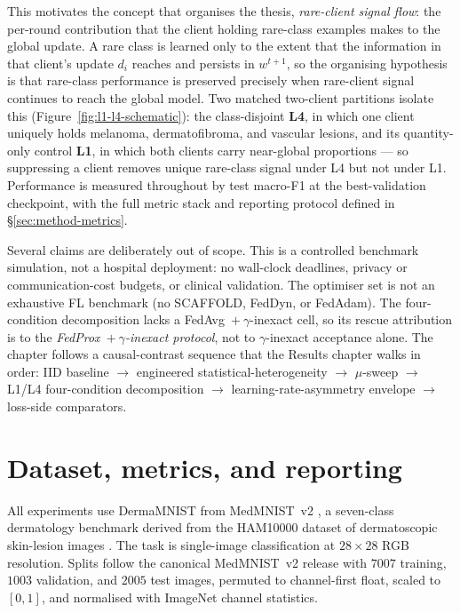 \documentclass[11pt,a4paper]{report}
\begin{document}
This motivates the concept that organises the thesis, \emph{rare-client signal
flow}: the per-round contribution that the client holding rare-class examples
makes to the global update. A rare class is learned only to the extent that the
information in that client's update $d_i$ reaches and persists in $w^{t+1}$, so the
organising hypothesis is that rare-class performance is preserved precisely when
rare-client signal continues to reach the global model. Two matched two-client
partitions isolate this (Figure~\ref{fig:l1-l4-schematic}): the class-disjoint
\textbf{L4}, in which one client uniquely holds melanoma, dermatofibroma, and
vascular lesions, and its quantity-only control \textbf{L1}, in which both clients
carry near-global proportions --- so suppressing a client removes unique
rare-class signal under L4 but not under L1. Performance is measured throughout by
test macro-F1 at the best-validation checkpoint, with the full metric stack and
reporting protocol defined in \S\ref{sec:method-metrics}.

Several claims are deliberately out of scope. This is a controlled benchmark
simulation, not a hospital deployment: no wall-clock deadlines, privacy or
communication-cost budgets, or clinical validation. The optimiser set is not an exhaustive FL
benchmark (no SCAFFOLD, FedDyn, or FedAdam). The four-condition decomposition
lacks a FedAvg~$+~\gamma$-inexact cell, so its rescue attribution is to the
\emph{FedProx~$+~\gamma$-inexact protocol}, not to $\gamma$-inexact acceptance
alone. The chapter follows a causal-contrast sequence that the
Results chapter walks in order: IID baseline $\to$ engineered
statistical-heterogeneity $\to$ $\mu$-sweep $\to$ L1/L4 four-condition
decomposition $\to$ learning-rate-asymmetry envelope $\to$ loss-side comparators.

\section{Dataset, metrics, and reporting}
\label{sec:method-dataset}
\label{sec:method-metrics}

All experiments use DermaMNIST from MedMNIST~v2 \citep{yang2023medmnistv2}, a
seven-class dermatology benchmark derived from the HAM10000 dataset of
dermatoscopic skin-lesion images \citep{tschandl2018ham10000}. The task is
single-image classification at $28 \times 28$ RGB resolution. Splits follow the
canonical MedMNIST~v2 release with $7007$ training, $1003$ validation, and $2005$
test images, permuted to channel-first float, scaled to $[0, 1]$, and normalised
with ImageNet channel statistics.
\end{document}
